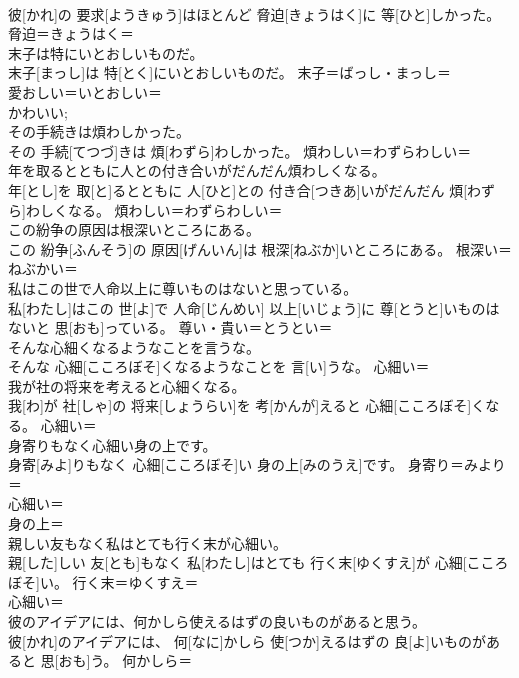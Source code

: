 \documentclass[8pt]{extreport}
\begin{document}
\begin{CJK}{UTF8}{min}
\\	彼[かれ]の 要求[ようきゅう]はほとんど 脅迫[きょうはく]に 等[ひと]しかった。	脅迫＝きょうはく＝ 
\\	末子は特にいとおしいものだ。	
\\	末子[まっし]は 特[とく]にいとおしいものだ。	末子＝ばっし・まっし＝ 
\\	愛おしい＝いとおしい＝ 
\\	かわいい; 
\\	その手続きは煩わしかった。	
\\	その 手続[てつづ]きは 煩[わずら]わしかった。	煩わしい＝わずらわしい＝ 
\\	年を取るとともに人との付き合いがだんだん煩わしくなる。	
\\	年[とし]を 取[と]るとともに 人[ひと]との 付き合[つきあ]いがだんだん 煩[わずら]わしくなる。	煩わしい＝わずらわしい＝ 
\\	この紛争の原因は根深いところにある。	
\\	この 紛争[ふんそう]の 原因[げんいん]は 根深[ねぶか]いところにある。	根深い＝ねぶかい＝ 
\\	私はこの世で人命以上に尊いものはないと思っている。	
\\	私[わたし]はこの 世[よ]で 人命[じんめい] 以上[いじょう]に 尊[とうと]いものはないと 思[おも]っている。	尊い・貴い＝とうとい＝ 
\\	そんな心細くなるようなことを言うな。	
\\	そんな 心細[こころぼそ]くなるようなことを 言[い]うな。	心細い＝ 
\\	我が社の将来を考えると心細くなる。	
\\	我[わ]が 社[しゃ]の 将来[しょうらい]を 考[かんが]えると 心細[こころぼそ]くなる。	心細い＝ 
\\	身寄りもなく心細い身の上です。	
\\	身寄[みよ]りもなく 心細[こころぼそ]い 身の上[みのうえ]です。	身寄り＝みより＝ 
\\	心細い＝ 
\\	身の上＝ 
\\	親しい友もなく私はとても行く末が心細い。	
\\	親[した]しい 友[とも]もなく 私[わたし]はとても 行く末[ゆくすえ]が 心細[こころぼそ]い。	行く末＝ゆくすえ＝ 
\\	心細い＝ 
\\	彼のアイデアには、何かしら使えるはずの良いものがあると思う。	
\\	彼[かれ]のアイデアには、 何[なに]かしら 使[つか]えるはずの 良[よ]いものがあると 思[おも]う。	何かしら＝ 

\end{CJK}
\end{document}
